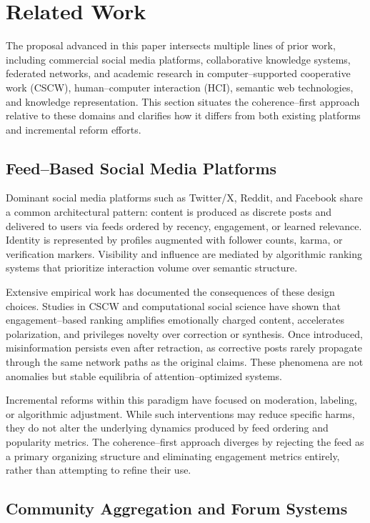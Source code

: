 \documentclass[11pt]{article}
\begin{document}
\section{Related Work}

The proposal advanced in this paper intersects multiple lines of prior work, including
commercial social media platforms, collaborative knowledge systems, federated networks,
and academic research in computer--supported cooperative work (CSCW), human--computer
interaction (HCI), semantic web technologies, and knowledge representation. This section
situates the coherence--first approach relative to these domains and clarifies how it
differs from both existing platforms and incremental reform efforts.

\subsection{Feed--Based Social Media Platforms}

Dominant social media platforms such as Twitter/X, Reddit, and Facebook share a common
architectural pattern: content is produced as discrete posts and delivered to users via
feeds ordered by recency, engagement, or learned relevance. Identity is represented by
profiles augmented with follower counts, karma, or verification markers. Visibility and
influence are mediated by algorithmic ranking systems that prioritize interaction volume
over semantic structure.

Extensive empirical work has documented the consequences of these design choices. Studies
in CSCW and computational social science have shown that engagement--based ranking
amplifies emotionally charged content, accelerates polarization, and privileges novelty
over correction or synthesis. Once introduced, misinformation persists even after
retraction, as corrective posts rarely propagate through the same network paths as the
original claims. These phenomena are not anomalies but stable equilibria of
attention--optimized systems.

Incremental reforms within this paradigm have focused on moderation, labeling, or
algorithmic adjustment. While such interventions may reduce specific harms, they do not
alter the underlying dynamics produced by feed ordering and popularity metrics. The
coherence--first approach diverges by rejecting the feed as a primary organizing
structure and eliminating engagement metrics entirely, rather than attempting to refine
their use.

\subsection{Community Aggregation and Forum Systems}
\end{document}
